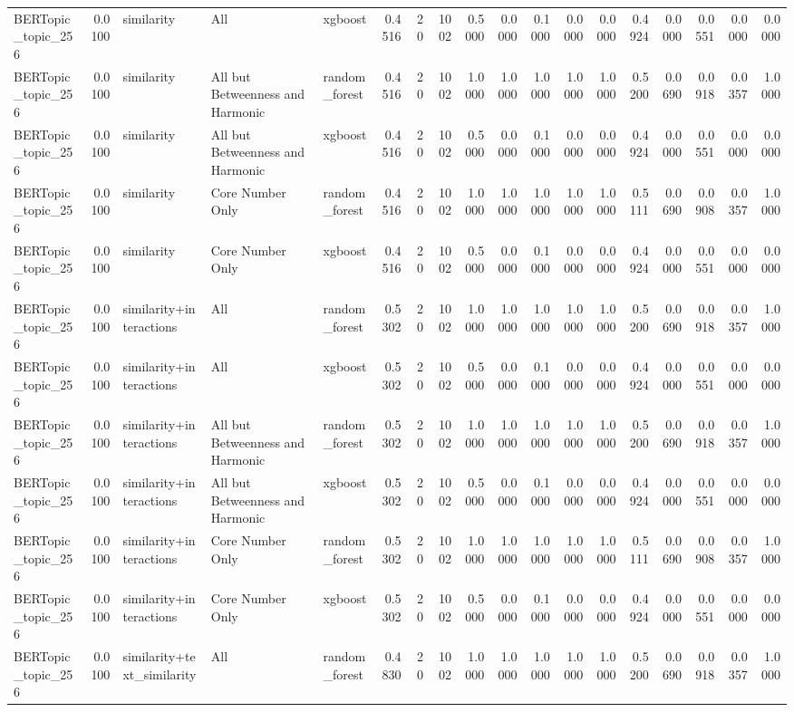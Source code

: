 \begin{tabular}{lrlllrrrrrrrrrrrrr}
BERTopic_topic_256 & 0.0100 & similarity & All & xgboost & 0.4516 & 20 & 1002 & 0.5000 & 0.0000 & 0.1000 & 0.0000 & 0.0000 & 0.4924 & 0.0000 & 0.0551 & 0.0000 & 0.0000 \\
BERTopic_topic_256 & 0.0100 & similarity & All but Betweenness and Harmonic & random_forest & 0.4516 & 20 & 1002 & 1.0000 & 1.0000 & 1.0000 & 1.0000 & 1.0000 & 0.5200 & 0.0690 & 0.0918 & 0.0357 & 1.0000 \\
BERTopic_topic_256 & 0.0100 & similarity & All but Betweenness and Harmonic & xgboost & 0.4516 & 20 & 1002 & 0.5000 & 0.0000 & 0.1000 & 0.0000 & 0.0000 & 0.4924 & 0.0000 & 0.0551 & 0.0000 & 0.0000 \\
BERTopic_topic_256 & 0.0100 & similarity & Core Number Only & random_forest & 0.4516 & 20 & 1002 & 1.0000 & 1.0000 & 1.0000 & 1.0000 & 1.0000 & 0.5111 & 0.0690 & 0.0908 & 0.0357 & 1.0000 \\
BERTopic_topic_256 & 0.0100 & similarity & Core Number Only & xgboost & 0.4516 & 20 & 1002 & 0.5000 & 0.0000 & 0.1000 & 0.0000 & 0.0000 & 0.4924 & 0.0000 & 0.0551 & 0.0000 & 0.0000 \\
BERTopic_topic_256 & 0.0100 & similarity+interactions & All & random_forest & 0.5302 & 20 & 1002 & 1.0000 & 1.0000 & 1.0000 & 1.0000 & 1.0000 & 0.5200 & 0.0690 & 0.0918 & 0.0357 & 1.0000 \\
BERTopic_topic_256 & 0.0100 & similarity+interactions & All & xgboost & 0.5302 & 20 & 1002 & 0.5000 & 0.0000 & 0.1000 & 0.0000 & 0.0000 & 0.4924 & 0.0000 & 0.0551 & 0.0000 & 0.0000 \\
BERTopic_topic_256 & 0.0100 & similarity+interactions & All but Betweenness and Harmonic & random_forest & 0.5302 & 20 & 1002 & 1.0000 & 1.0000 & 1.0000 & 1.0000 & 1.0000 & 0.5200 & 0.0690 & 0.0918 & 0.0357 & 1.0000 \\
BERTopic_topic_256 & 0.0100 & similarity+interactions & All but Betweenness and Harmonic & xgboost & 0.5302 & 20 & 1002 & 0.5000 & 0.0000 & 0.1000 & 0.0000 & 0.0000 & 0.4924 & 0.0000 & 0.0551 & 0.0000 & 0.0000 \\
BERTopic_topic_256 & 0.0100 & similarity+interactions & Core Number Only & random_forest & 0.5302 & 20 & 1002 & 1.0000 & 1.0000 & 1.0000 & 1.0000 & 1.0000 & 0.5111 & 0.0690 & 0.0908 & 0.0357 & 1.0000 \\
BERTopic_topic_256 & 0.0100 & similarity+interactions & Core Number Only & xgboost & 0.5302 & 20 & 1002 & 0.5000 & 0.0000 & 0.1000 & 0.0000 & 0.0000 & 0.4924 & 0.0000 & 0.0551 & 0.0000 & 0.0000 \\
BERTopic_topic_256 & 0.0100 & similarity+text_similarity & All & random_forest & 0.4830 & 20 & 1002 & 1.0000 & 1.0000 & 1.0000 & 1.0000 & 1.0000 & 0.5200 & 0.0690 & 0.0918 & 0.0357 & 1.0000 \\

\end{tabular}

